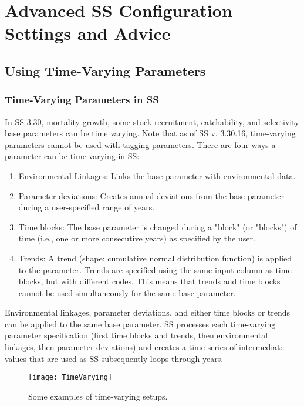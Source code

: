 \section{Advanced SS Configuration Settings and Advice}

\hypertarget{TVpara}{}
\subsection{Using Time-Varying Parameters}

\hypertarget{tvOrder}{}
\subsubsection{Time-Varying Parameters in SS}

In SS 3.30, mortality-growth, some stock-recruitment, catchability, and selectivity base parameters can be time varying. Note that as of SS v. 3.30.16, time-varying parameters cannot be used with tagging parameters. There are four ways a parameter can be time-varying in SS:
\begin{enumerate}
    \item Environmental Linkages: Links the base parameter with environmental data.
	\item Parameter deviations: Creates annual deviations from the base parameter during a user-specified range of years.
	\item Time blocks: The base parameter is changed during a "block" (or "blocks") of time (i.e., one or more consecutive years) as specified by the user.
	\item Trends: A trend (shape: cumulative normal distribution function) is applied to the parameter. Trends are specified using the same input column as time blocks, but with different codes. This means that trends and time blocks cannot be used simultaneously for the same base parameter.
\end{enumerate}

Environmental linkages, parameter deviations, and either time blocks or trends can be applied to the same base parameter. SS processes each time-varying parameter specification (first time blocks and trends, then environmental linkages, then parameter deviations) and creates a time-series of intermediate values that are used as SS subsequently loops through years.

\begin{figure}[h]
	\begin{center}
		\texttt{[image: TimeVarying]}\\
	\end{center}
	\caption{Some examples of time-varying setups.}
	\label{(fig:timevarying)}
\end{figure}

